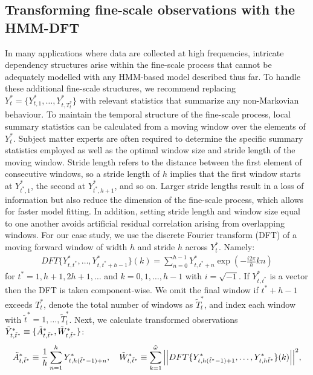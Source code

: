 \subsection{Transforming fine-scale observations with the HMM-DFT}
\label{subsec:STFT}

In many applications where data are collected at high frequencies, intricate dependency structures arise within the fine-scale process that cannot be adequately modelled with any HMM-based model described thus far. 
To handle these additional fine-scale structures, we recommend replacing $Y_t^* = \{Y^*_{t,1},\ldots,Y^*_{t,T^*_t}\}$ with relevant statistics that summarize any non-Markovian behaviour. To maintain the temporal structure of the fine-scale process, local summary statistics can be calculated from a moving window over the elements of $Y_t^*$. Subject matter experts are often required to determine the specific summary statistics employed as well as the optimal window size and stride length of the moving window. Stride length refers to the distance between the first element of consecutive windows, so a stride length of $h$ implies that the first window starts at $Y^*_{t^*,1}$, the second at $Y^*_{t^*,h+1}$, and so on. Larger stride lengths result in a loss of information but also reduce the dimension of the fine-scale process, which allows for faster model fitting. In addition, setting stride length and window size equal to one another avoids artificial residual correlation arising from overlapping windows. For our case study, we use the discrete Fourier transform (DFT) of a moving forward window of width $h$ and stride $h$ across $Y^*_t$. Namely:
%
\begin{align*}
    DFT\{Y^*_{t,t^*},\ldots, Y^*_{t,t^*+h-1}\}(k) = \sum_{n=0}^{h-1} Y^*_{t,t^*+n}\exp\left(-\frac{i 2\pi}{h} kn \right)
\end{align*}
%
for $t^* = 1,h+1,2h+1,\ldots$ and $k = 0, 1, \ldots, h-1$ with $i = \sqrt{-1}$. If $Y^*_{t,t^*}$ is a vector then the DFT is taken component-wise. We omit the final window if $t^*+h-1$ exceeds $T^*_t$, denote the total number of windows as $\tilde T^*_t$, and index each window with $\tilde{t}^* = 1,\ldots,\tilde T^*_t$. Next, we calculate transformed observations $\tilde{Y}^*_{t,\tilde{t}^*} \equiv \{\tilde{A}^*_{t,\tilde{t}^*},\tilde{W}^*_{t,\tilde{t}^*}\}$:
%
\begin{equation}
    \label{eqn:z}
    \Zone_{t,\tilde{t}^*} \equiv \frac{1}{h}\sum_{n=1}^{h}Y^*_{t,h(\tilde{t}^*-1)+n}, \quad \Ztwo_{t,\tilde{t}^*} \equiv \sum_{k=1}^{\tilde{\omega}}\Big|\Big|DFT\{Y^*_{t,h(\tilde{t}^*-1)+1},\ldots, Y^*_{t,h\tilde{t}^*}\}(k)\Big|\Big|^2,
\end{equation}
